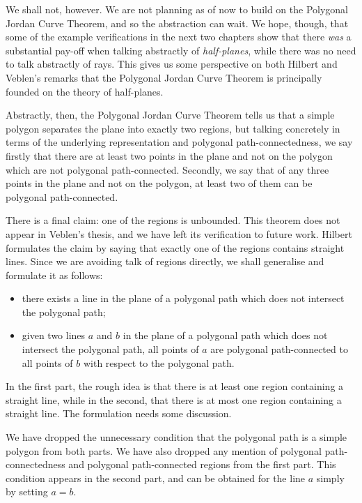 We shall not, however. We are not planning as of now to build on the Polygonal Jordan Curve Theorem, and so the abstraction can wait. We hope, though, that some of the example verifications in the next two chapters show that there \emph{was} a substantial pay-off when talking abstractly of \emph{half-planes}, while there was no need to talk abstractly of rays. This gives us some perspective on both Hilbert and Veblen's remarks that the Polygonal Jordan Curve Theorem is principally founded on the theory of half-planes.

Abstractly, then, the Polygonal Jordan Curve Theorem tells us that a simple polygon separates the plane into exactly two regions, but talking concretely in terms of the underlying representation and polygonal path-connectedness, we say firstly that there are at least two points in the plane and not on the polygon which are not polygonal path-connected. Secondly, we say that of any three points in the plane and not on the polygon, at least two of them can be polygonal path-connected.

There is a final claim: one of the regions is unbounded. This theorem does not appear in Veblen's thesis, and we have left its verification to future work. Hilbert formulates the claim by saying that exactly one of the regions contains straight lines. Since we are avoiding talk of regions directly, we shall generalise and formulate it as follows:
\begin{itemize}
\item there exists a line in the plane of a polygonal path which does not intersect the polygonal path;
\item given two lines $a$ and $b$ in the plane of a polygonal path which does not intersect the polygonal path, all points of $a$ are polygonal path-connected to all points of $b$ with respect to the polygonal path.
\end{itemize}

In the first part, the rough idea is that there is at least one region containing a straight line, while in the second, that there is at most one region containing a straight line. The formulation needs some discussion. 

We have dropped the unnecessary condition that the polygonal path is a simple polygon from both parts. We have also dropped any mention of polygonal path-connectedness and polygonal path-connected regions from the first part. This condition appears in the second part, and can be obtained for the line $a$ simply by setting $a=b$.

